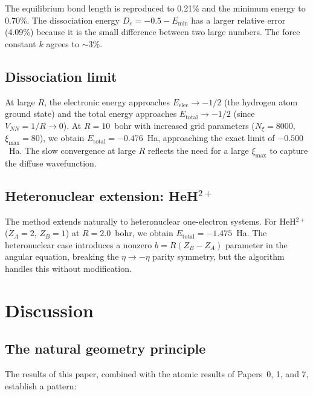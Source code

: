 \documentclass[aps,pra,twocolumn,superscriptaddress,longbibliography]{revtex4-2}
\begin{document}
The equilibrium bond length is reproduced to 0.21\% and the minimum
energy to 0.70\%.  The dissociation energy $D_e = -0.5 - E_{\min}$
has a larger relative error (4.09\%) because it is the small
difference between two large numbers.  The force constant $k$
agrees to $\sim 3\%$.

\subsection{Dissociation limit}

At large $R$, the electronic energy approaches $E_{\mathrm{elec}}
\to -1/2$ (the hydrogen atom ground state) and the total energy
approaches $E_{\mathrm{total}} \to -1/2$ (since $V_{NN} = 1/R
\to 0$).  At $R = 10$~bohr with increased grid parameters
($N_\xi = 8000$, $\xi_{\max} = 80$), we obtain $E_{\mathrm{total}}
= -0.476$~Ha, approaching the exact limit of $-0.500$~Ha.  The
slow convergence at large $R$ reflects the need for a large
$\xi_{\max}$ to capture the diffuse wavefunction.

\subsection{Heteronuclear extension: \texorpdfstring{HeH$^{2+}$}{HeH2+}}

The method extends naturally to heteronuclear one-electron systems.
For HeH$^{2+}$ ($Z_A = 2$, $Z_B = 1$) at $R = 2.0$~bohr, we
obtain $E_{\mathrm{total}} = -1.475$~Ha.  The heteronuclear case
introduces a nonzero $b = R(Z_B - Z_A)$ parameter in the angular
equation, breaking the $\eta \to -\eta$ parity symmetry, but the
algorithm handles this without modification.


\section{Discussion}
\label{sec:discussion}

\subsection{The natural geometry principle}

The results of this paper, combined with the atomic results of
Papers~0, 1, and 7, establish a pattern:
\end{document}
